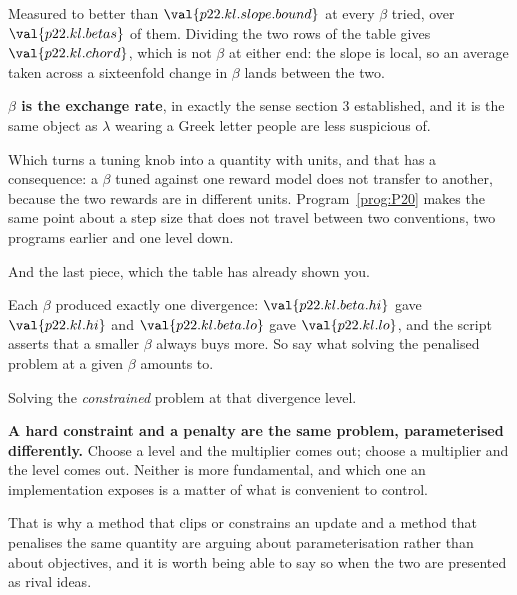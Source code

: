 \begin{fr}
\ans{$\beta$}
Measured to better than $\val{p22.kl.slope.bound}$ at every $\beta$ tried, over
$\val{p22.kl.betas}$ of them. Dividing the two rows of the table gives
$\val{p22.kl.chord}$, which is not $\beta$ at either end: the slope is local, so
an average taken across a sixteenfold change in $\beta$ lands between the two.

\textbf{$\beta$ is the exchange rate}, in exactly
the sense section 3 established, and it is the same object as $\lambda$ wearing
a Greek letter people are less suspicious of.

Which turns a tuning knob into a quantity with units, and that has a
consequence: a $\beta$ tuned against one reward model does not transfer to
another, because the two rewards are in different units. Program~\ref{prog:P20}
makes the same point about a step size that does not travel between two
conventions, two programs earlier and one level down.
\end{fr}

\begin{fr}
And the last piece, which the table has already shown you.

Each $\beta$ produced exactly one divergence: $\val{p22.kl.beta.hi}$ gave
$\val{p22.kl.hi}$ and $\val{p22.kl.beta.lo}$ gave $\val{p22.kl.lo}$, and the
script asserts that a smaller $\beta$ always buys more. So say what solving the
penalised problem at a given $\beta$ amounts to.
\nextframe
\end{fr}

\begin{fr}
\begin{ansblock}
Solving the \emph{constrained} problem at that divergence level.
\end{ansblock}

\textbf{A hard constraint and a penalty are the same problem, parameterised
differently.} Choose a level and the multiplier comes out; choose a multiplier
and the level comes out. Neither is more fundamental, and which one an
implementation exposes is a matter of what is convenient to control.

That is why a method that clips or constrains an update and a method that
penalises the same quantity are arguing about parameterisation rather than
about objectives, and it is worth being able to say so when the two are
presented as rival ideas.
\end{fr}

